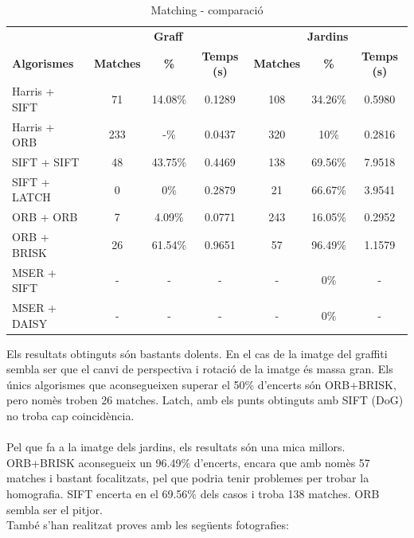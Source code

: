 		\begin{table}[H]
			\begin{center}
				\begin{tabular}{l | c c c | c c c}
					& \multicolumn{3}{c|}{\textbf{Graff}} & \multicolumn{3}{c}{\textbf{Jardins}} \\
					\textbf{Algorismes} & \textbf{Matches} & \textbf{\%} & \textbf{Temps (s)} & \textbf{Matches} & \textbf{\%} & \textbf{Temps (s)} \\ \hline
					Harris + SIFT & 71 & 14.08\% & 0.1289 & 108 & 34.26\% & 0.5980 \\
					Harris + ORB & 233 & -\% & 0.0437 & 320 & 10\% & 0.2816 \\
					SIFT + SIFT & 48 & 43.75\% & 0.4469 & 138 & 69.56\% & 7.9518 \\
					SIFT + LATCH & 0 & 0\% & 0.2879 & 21 & 66.67\% & 3.9541 \\
					ORB + ORB & 7 & 4.09\% & 0.0771 & 243 & 16.05\% & 0.2952 \\
					ORB + BRISK & 26 & 61.54\% & 0.9651 & 57 & 96.49\% & 1.1579 \\
					MSER + SIFT & - & - & - & - & 0\% & - \\
					MSER + DAISY & - & - & - & - & 0\% & - \\
				\end{tabular}
			\end{center}
			\caption{Matching - comparació}
		\end{table}
		\noindent
		Els resultats obtinguts són bastants dolents. En el cas de la imatge del graffiti sembla ser que el canvi de perspectiva i rotació de la imatge és massa gran.
		Els únics algorismes que aconsegueixen superar el 50\% d'encerts són ORB+BRISK, pero nomès troben 26 matches. Latch, amb els punts obtinguts amb SIFT (DoG) no troba cap coincidència.\\\\
		Pel que fa a la imatge dels jardins, els resultats són una mica millors. ORB+BRISK aconsegueix un 96.49\% d'encerts, encara que amb nomès 57 matches i bastant focalitzats, pel que podria tenir
		problemes per trobar la homografia. SIFT encerta en el 69.56\% dels casos i troba 138 matches. ORB sembla ser el pitjor.\\

		\noindent
		També s'han realitzat proves amb les següents fotografies:

